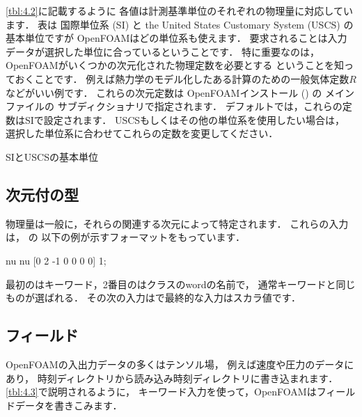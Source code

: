 \autoref{tbl:4.2}に記載するように
各値は計測基準単位のそれぞれの物理量に対応しています．
表は
%
%
国際単位系 (SI) と
%
%
%
the United States Customary System (USCS) の
%
基本単位ですが
OpenFOAMはどの単位系も使えます．
要求されることは入力データが選択した単位に合っているということです．
特に重要なのは，OpenFOAMがいくつかの次元化された物理定数を必要とする
ということを知っておくことです．
例えば熱力学のモデル化したある計算のための一般気体定数$R$などがいい例です．
これらの次元定数は
OpenFOAMインストール () の
メインファイルの
サブディクショナリで指定されます．
デフォルトでは，これらの定数はSIで設定されます．
USCSもしくはその他の単位系を使用したい場合は，
選択した単位系に合わせてこれらの定数を変更してください．


\begin{table}[t]
 
 \caption{SIとUSCSの基本単位}
 \label{tbl:4.2}
\end{table}
%


\subsection{次元付の型}
\label{ssec:4.2.7}
物理量は一般に，それらの関連する次元によって特定されます．
これらの入力は，\break
{}の
以下の例が示すフォーマットをもっています．
\begin{OFverbatim}[file]
nu             nu  [0 2 -1 0 0 0 0]  1;
\end{OFverbatim}
最初のはキーワード，2番目のはクラスのwordの名前で，
通常キーワードと同じものが選ばれる．
その次の入力はで最終的な入力はスカラ値です．


\subsection{フィールド}
\label{ssec:4.2.8}
OpenFOAMの入出力データの多くはテンソル場，
例えば速度や圧力のデータにあり，
時刻ディレクトリから読み込み時刻ディレクトリに書き込まれます．
\autoref{tbl:4.3}で説明されるように，
キーワード入力を使って，OpenFOAMはフィールドデータを書きこみます．


